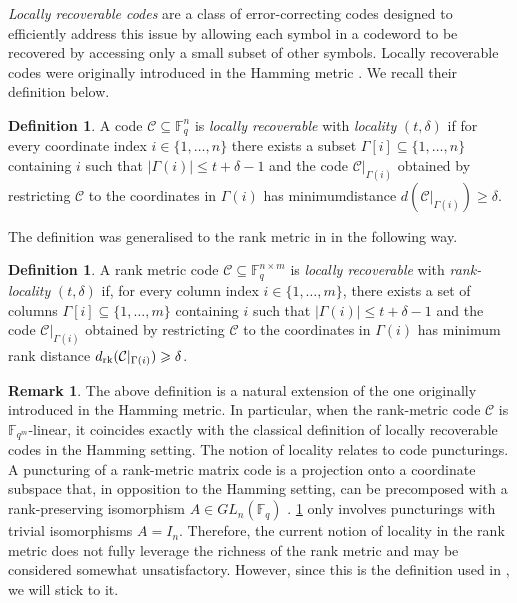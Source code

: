 \documentclass[11pt]{article}
\theoremstyle{definition}
\newtheorem{definition}[theorem]{Definition}
\newtheorem{remark}[theorem]{Remark}
\renewcommand\geq{\geqslant}
\renewcommand\leq{\leqslant}
\newcommand\F{\mathbb{F}}
\newcommand\Fq{\mathbb{F}_q}
\newcommand\Fqm{\F_{q^m}}
\newcommand\rk{\text{\rm rk}}
\begin{document}
\emph{Locally recoverable codes} are a class of error-correcting codes designed to efficiently address this issue by allowing each symbol in a codeword to be recovered by accessing only a small subset of other symbols.  Locally recoverable codes were originally introduced in the Hamming metric \cite{GHSY12,lrc}. We recall their definition below.
\begin{definition}{\cite[Definition 2]{BTV17}}\label{def:hamminglocality}
A code $\mathcal{C}\subseteq \Fq^{n}$ is \emph{locally recoverable} with \emph{locality} $(t,\delta)$ if for every coordinate index $i\in\{1,\dots, n\}$ there exists a subset $\Gamma[i]\subseteq \{1,\dots, n\}$ containing $i$ such that $|\Gamma(i)| \leq t+\delta-1$ and the code $\mathcal C|_{\Gamma(i)}$ obtained by restricting $\mathcal{C}$ to the coordinates in $\Gamma(i)$ has minimumdistance $d(\mathcal C|_{\Gamma(i)})\geq \delta$.
\end{definition}
The definition was generalised to the rank metric in \cite{duursma} in the following way.

\begin{definition}\label{def:ranklocality}
A rank metric code $\mathcal{C}\subseteq \Fq^{n\times m}$ is \emph{locally recoverable} with \emph{rank-locality} $(t,\delta)$ if, for every column index $i\in\{1,\dots, m\}$, there exists a set of columns $\Gamma[i]\subseteq \{1,\dots, m\}$ containing $i$ such that $|\Gamma(i)| \leq t+\delta-1$ and the code $\mathcal C|_{\Gamma(i)}$ obtained by restricting $\mathcal{C}$ to the coordinates in $\Gamma(i)$ has minimum rank distance $d_\rk(\mathcal C|_{\Gamma(i)})\geq \delta$.
\end{definition}

\begin{remark}
The above definition is a natural extension of the one originally introduced in the Hamming metric. In particular, when the rank-metric code $\mathcal{C}$ is $\Fqm$-linear, it coincides exactly with the classical definition of locally recoverable codes in the Hamming setting. 
The notion of locality relates to code puncturings. A puncturing of a rank-metric matrix code is a projection onto a coordinate subspace that, in opposition to the Hamming setting, can be precomposed with a rank-preserving isomorphism $A \in GL_n(\Fq)$ \cite[Definition~2.15]{neri19}. \cref{def:ranklocality} only involves puncturings with trivial isomorphisms $A=I_n$. Therefore, the current notion of locality in the rank metric does not fully leverage the richness of the rank metric and may be considered somewhat unsatisfactory. However, since this is the definition used in \cite{BDM24preprint}, we will stick to it.
\end{remark}
\end{document}
